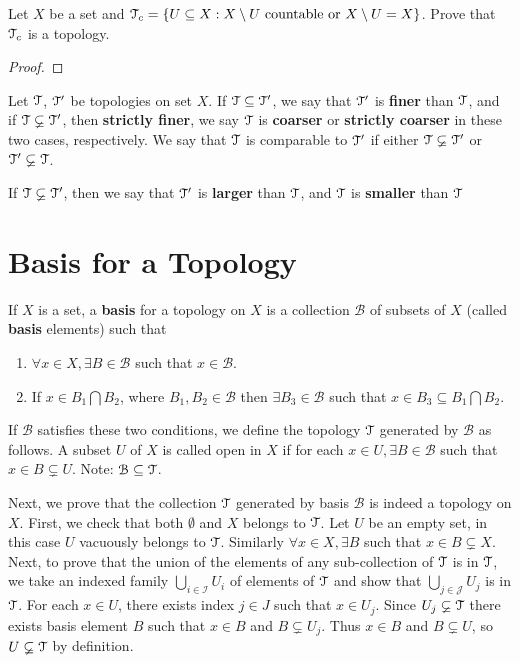 \documentclass[a4paper,english,12pt]{article}   	%
\begin{document}
\begin{exmp} 
 Let $X$ be a set and $\mathcal{T}_c=\{U\subseteq X: X \setminus U \text{ countable or } X \setminus U =X  \}$. Prove that $\mathcal{T}_c$ is a topology.
\end{exmp}
\begin{proof}
 
\end{proof}

\begin{defn}
 Let $\mathcal{T}$, $\mathcal{T}'$ be topologies on set $X$. If $\mathcal{T}\subseteq\mathcal{T}'$, we say that $\mathcal{T}'$ is \textbf{finer} than $\mathcal{T}$, and if  $\mathcal{T}\varsubsetneq\mathcal{T}'$, then \textbf{strictly finer}, we say $\mathcal{T}$ is \textbf{coarser} or \textbf{strictly coarser} in these two cases, respectively. We say that $\mathcal{T}$ is comparable to $\mathcal{T}'$ if either
 $\mathcal{T}\varsubsetneq\mathcal{T}'$ or $\mathcal{T}' \varsubsetneq\mathcal{T}$.
\end{defn}
\begin{defn}
 If $\mathcal{T}\varsubsetneq\mathcal{T}'$, then we say that $\mathcal{T}'$ is \textbf{larger} than $\mathcal{T}$, and $\mathcal{T}$ is \textbf{smaller} than $\mathcal{T}$
\end{defn}

\section{Basis for a Topology}
\begin{defn}
 If $X$ is a set, a \textbf{basis} for a topology on $X$ is a collection $\mathcal{B}$ of subsets of $X$ (called \textbf{basis} elements) such that 
 \begin{enumerate}
  \item $\forall x\in X, \exists B\in \mathcal{B}$ such that $x\in \mathcal{B}$.
  \item If $x\in B_1\bigcap B_2$, where $B_1, B_2 \in \mathcal{B}$ then $\exists B_3 \in \mathcal{B}$ such that $x\in B_3\subseteq B_1\bigcap B_2$.
 \end{enumerate}
\end{defn}
 If $\mathcal{B}$ satisfies these two conditions, we define the topology $\mathcal{T}$ generated by $\mathcal{B}$ as follows. A subset $U$ of $X$ is called open in $X$ if for each $x\in U, \exists B\in \mathcal{B}$ such that $x\in B\varsubsetneq U$. 
 Note: $\mathcal{B}\subseteq\mathcal{T}$.
 
 Next, we prove that the collection $\mathcal{T}$ generated by basis $\mathcal{B}$ is indeed a topology on $X$. First, we check that both $\emptyset$ and $X$ belongs to $\mathcal{T}$. Let $U$ be an empty set, in this case $U$ vacuously belongs to $\mathcal{T}$. Similarly $\forall x\in X, \exists B$ such that $x\in B\varsubsetneq X$. Next, to prove that the union of the elements of any sub-collection of $\mathcal{T}$ is in $\mathcal{T}$, we take an indexed family $\bigcup_{i\in \mathcal{I}}U_i$ of elements of $\mathcal{T}$  and show that $\bigcup_{j\in \mathcal{J}}U_j$ is in $\mathcal{T}$. For each $x\in U$, there exists index $j\in J$ such that $x\in U_j$. Since $U_j \varsubsetneq \mathcal{T}$ there exists basis element $B$ such that $x\in B$ and $B\varsubsetneq U_j$. Thus $x\in B$ and $B\varsubsetneq U$, so $U\varsubsetneq\mathcal{T}$ by definition. 
 
\end{document}
